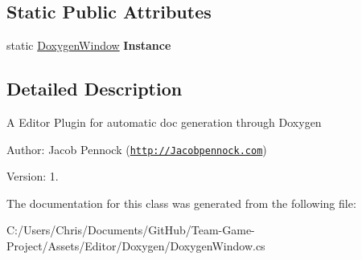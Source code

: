 \subsection*{Static Public Attributes}
\begin{DoxyCompactItemize}
\item 
static \hyperlink{class_doxygen_window}{Doxygen\+Window} {\bfseries Instance}\hypertarget{class_doxygen_window_a45d09c9a64d2873367470303789e3bf9}{}\label{class_doxygen_window_a45d09c9a64d2873367470303789e3bf9}

\end{DoxyCompactItemize}


\subsection{Detailed Description}


A Editor Plugin for automatic doc generation through Doxygen

Author\+: Jacob Pennock (\href{http://Jacobpennock.com}{\tt http\+://\+Jacobpennock.\+com})

Version\+: 1.

The documentation for this class was generated from the following file\+:\begin{DoxyCompactItemize}
\item 
C\+:/\+Users/\+Chris/\+Documents/\+Git\+Hub/\+Team-\/\+Game-\/\+Project/\+Assets/\+Editor/\+Doxygen/Doxygen\+Window.\+cs\end{DoxyCompactItemize}
